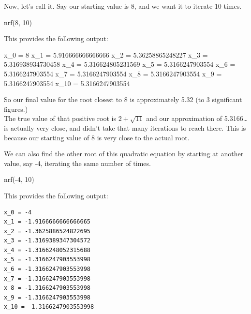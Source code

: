 \documentclass[
]{article}
\newenvironment{Shaded}{}{}
\newcommand{\DecValTok}[1]{\textcolor[rgb]{0.25,0.63,0.44}{#1}}
\newcommand{\NormalTok}[1]{#1}
\newcommand{\OperatorTok}[1]{\textcolor[rgb]{0.40,0.40,0.40}{#1}}
\begin{document}
Now, let's call it. Say our starting value is 8, and we want it to
iterate 10 times.

\begin{Shaded}
\begin{Highlighting}[]
\NormalTok{nrf(}\DecValTok{8}\NormalTok{, }\DecValTok{10}\NormalTok{)}
\end{Highlighting}
\end{Shaded}

This provides the following output:

\begin{Shaded}
\begin{Highlighting}[]
\NormalTok{x\_0 = }\DecValTok{8}
\NormalTok{x\_1 = }\DecValTok{5}\NormalTok{.916666666666666}
\NormalTok{x\_2 = }\DecValTok{5}\NormalTok{.36258865248227}
\NormalTok{x\_3 = }\DecValTok{5}\NormalTok{.316938934730458}
\NormalTok{x\_4 = }\DecValTok{5}\NormalTok{.316624805231569}
\NormalTok{x\_5 = }\DecValTok{5}\NormalTok{.3166247903554}
\NormalTok{x\_6 = }\DecValTok{5}\NormalTok{.3166247903554}
\NormalTok{x\_7 = }\DecValTok{5}\NormalTok{.3166247903554}
\NormalTok{x\_8 = }\DecValTok{5}\NormalTok{.3166247903554}
\NormalTok{x\_9 = }\DecValTok{5}\NormalTok{.3166247903554}
\NormalTok{x\_10 = }\DecValTok{5}\NormalTok{.3166247903554}
\end{Highlighting}
\end{Shaded}

So our final value for the root closest to 8 is approximately 5.32 (to 3
significant figures.)\\
The true value of that positive root is \(2+\sqrt{11}\) and our
approximation of 5.3166\ldots{} is actually very close, and didn't take
that many iterations to reach there. This is because our starting value
of 8 is very close to the actual root.

We can also find the other root of this quadratic equation by starting
at another value, say -4, iterating the same number of times.

\begin{Shaded}
\begin{Highlighting}[]
\NormalTok{nrf(}\OperatorTok{{-}}\DecValTok{4}\NormalTok{, }\DecValTok{10}\NormalTok{)}
\end{Highlighting}
\end{Shaded}

This provides the following output:

\begin{verbatim}
x_0 = -4
x_1 = -1.9166666666666665
x_2 = -1.3625886524822695
x_3 = -1.3169389347304572
x_4 = -1.3166248052315688
x_5 = -1.3166247903553998
x_6 = -1.3166247903553998
x_7 = -1.3166247903553998
x_8 = -1.3166247903553998
x_9 = -1.3166247903553998
x_10 = -1.3166247903553998
\end{verbatim}
\end{document}
